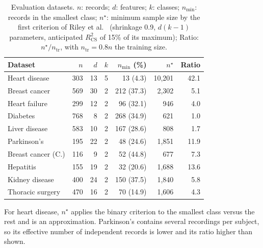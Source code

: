 \documentclass[conference]{IEEEtran}
\providecommand{\DIFaddbeginFL}{} %
\providecommand{\DIFaddendFL}{} %
\providecommand{\DIFdelbeginFL}{} %
\providecommand{\DIFdelendFL}{} %
\newcommand{\DIFscaledelfig}{0.5}
\newlength{\DIFdelgraphicswidth} %
\newlength{\DIFdelgraphicsheight} %
\newcommand{\DIFaddincludegraphics}[2][]{{\color{blue}\fbox{\DIFOincludegraphics[#1]{#2}}}} %
\newcommand{\DIFdelincludegraphics}[2][]{%
\sbox{\DIFdelgraphicsbox}{\DIFOincludegraphics[#1]{#2}}%
\settoboxwidth{\DIFdelgraphicswidth}{\DIFdelgraphicsbox} %
\settoboxtotalheight{\DIFdelgraphicsheight}{\DIFdelgraphicsbox} %
\scalebox{\DIFscaledelfig}{%
\parbox[b]{\DIFdelgraphicswidth}{\usebox{\DIFdelgraphicsbox}\\[-\baselineskip] \rule{\DIFdelgraphicswidth}{0em}}\llap{\resizebox{\DIFdelgraphicswidth}{\DIFdelgraphicsheight}{%
\setlength{\unitlength}{\DIFdelgraphicswidth}%
\begin{picture}(1,1)%
\thicklines\linethickness{2pt} %
{\color[rgb]{1,0,0}\put(0,0){\framebox(1,1){}}}%
{\color[rgb]{1,0,0}\put(0,0){\line( 1,1){1}}}%
{\color[rgb]{1,0,0}\put(0,1){\line(1,-1){1}}}%
\end{picture}%
}\hspace*{3pt}}} %
} %
\DeclareRobustCommand{\DIFaddbeginFL}{\DIFOaddbeginFL \let\includegraphics\DIFaddincludegraphics} %
\DeclareRobustCommand{\DIFaddendFL}{\DIFOaddendFL \let\includegraphics\DIFOincludegraphics} %
\DeclareRobustCommand{\DIFdelbeginFL}{\DIFOdelbeginFL \let\includegraphics\DIFdelincludegraphics} %
\DeclareRobustCommand{\DIFdelendFL}{\DIFOaddendFL \let\includegraphics\DIFOincludegraphics} %
\begin{document}
\begin{table}[t]
\centering
\caption{Evaluation datasets. $n$: records; $d$: features; $k$: classes; $n_{\min}$: records in the smallest class; $n^{\star}$: minimum sample size by the first criterion of Riley et al.~\cite{riley2019binary} (shrinkage 0.9, $d(k-1)$ parameters, anticipated $R^2_{\mathrm{CS}}$ of 15\% of its maximum); Ratio: $n^{\star}/n_{\mathrm{tr}}$, with $n_{\mathrm{tr}}=0.8n$ the training size.}
\label{tab:datasets}
\footnotesize
\setlength{\tabcolsep}{3pt}
\DIFdelbeginFL %
\DIFdelendFL \DIFaddbeginFL \begin{tabular*}{\columnwidth}{@{\extracolsep{\fill}}lrrrrrr@{}}
\toprule
Dataset & $n$ & $d$ & $k$ & $n_{\min}$ (\%) & $n^{\star}$ & Ratio \\
\midrule
Heart disease & 303 & 13 & 5 & 13 (4.3) & 10,201 & 42.1 \\
Breast cancer & 569 & 30 & 2 & 212 (37.3) & 2,302 & 5.1 \\
Heart failure & 299 & 12 & 2 & 96 (32.1) & 946 & 4.0 \\
Diabetes & 768 & 8 & 2 & 268 (34.9) & 621 & 1.0 \\
Liver disease & 583 & 10 & 2 & 167 (28.6) & 808 & 1.7 \\
Parkinson's & 195 & 22 & 2 & 48 (24.6) & 1,851 & 11.9 \\
Breast cancer (C.) & 116 & 9 & 2 & 52 (44.8) & 677 & 7.3 \\
Hepatitis & 155 & 19 & 2 & 32 (20.6) & 1,688 & 13.6 \\
Kidney disease & 400 & 24 & 2 & 150 (37.5) & 1,840 & 5.8 \\
Thoracic surgery & 470 & 16 & 2 & 70 (14.9) & 1,606 & 4.3 \\
\bottomrule
\end{tabular*}
\DIFaddendFL \par\vspace{2pt}\raggedright\scriptsize For heart disease, $n^{\star}$ applies the binary criterion to the smallest class versus the rest and is an approximation. Parkinson's contains several recordings per subject, so its effective number of independent records is lower and its ratio higher than shown.
\end{table}
\end{document}

